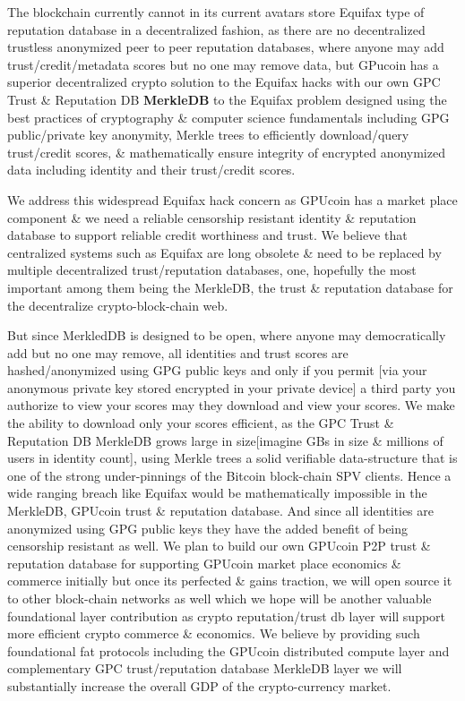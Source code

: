 The blockchain currently cannot in its current avatars store Equifax type of reputation database in a decentralized fashion, as there are no decentralized trustless anonymized peer to peer reputation databases, where anyone may add trust/credit/metadata scores but no one may remove data, but GPucoin has a superior decentralized crypto solution to the Equifax hacks with our own GPC Trust & Reputation DB \textbf{MerkleDB} to the Equifax problem designed using the best practices of cryptography \& computer science fundamentals including GPG public/private key anonymity, Merkle trees to efficiently download/query trust/credit scores, \& mathematically ensure integrity of encrypted anonymized data including identity and their trust/credit scores.

We address this widespread Equifax hack concern as GPUcoin has a market place component & we need a reliable censorship resistant identity \& reputation database to support reliable credit worthiness and trust. We believe that centralized systems such as Equifax are long obsolete \& need to be replaced by multiple decentralized trust/reputation databases, one, hopefully the most important among them being the MerkleDB, the trust \& reputation database for the decentralize crypto-block-chain web. 

But since MerkledDB is designed to be open, where anyone may democratically add but no one may remove, all identities and trust scores are hashed/anonymized using GPG public keys and only if you permit [via your anonymous private key stored encrypted in your private device] a third party you authorize to view your scores may they download and view your scores. We make the ability to download only your scores efficient, as the GPC Trust & Reputation DB MerkleDB grows large in size[imagine GBs in size \& millions of users in identity count], using Merkle trees a solid verifiable data-structure that is one of the strong under-pinnings of the Bitcoin block-chain SPV clients. Hence a wide ranging breach like Equifax would be mathematically impossible in the MerkleDB, GPUcoin trust \& reputation database.
And since all identities are anonymized using GPG public keys they have the added benefit of being censorship resistant as well. We plan to build our own GPUcoin P2P trust & reputation database for supporting GPUcoin market place economics \& commerce initially but once its perfected \& gains traction, we will open source it to other block-chain networks as well which we hope will be another valuable foundational layer contribution as crypto reputation/trust db layer will support more efficient crypto commerce \& economics. We believe by providing such foundational fat protocols including the GPUcoin distributed compute layer and complementary GPC trust/reputation database MerkleDB layer we will substantially increase the overall GDP of the crypto-currency market.